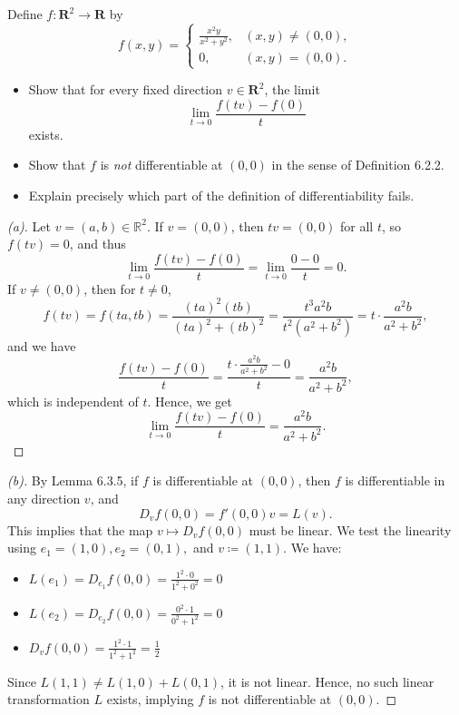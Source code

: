 \begin{problem}
    Define $f : \mathbf{R}^2 \to \mathbf{R}$ by
$$
f(x,y)=
\begin{cases}
\displaystyle
\frac{x^2 y}{x^2+y^2}, & (x,y)\neq(0,0),\\[1em]
0, & (x,y)=(0,0).
\end{cases}
$$

\begin{itemize}
\item[(a)] Show that for every fixed direction $v\in\mathbf{R}^2$, 
the limit
$$
\lim_{t\to 0} \frac{f(tv)-f(0)}{t}
$$
exists.

\item[(b)] Show that $f$ is \emph{not} differentiable at $(0,0)$
in the sense of Definition 6.2.2.

\item[(c)] Explain precisely which part of the definition of differentiability fails.
\end{itemize}
\end{problem}

\begin{proof}[(a)]
    Let $v=(a,b)\in\mathbb{R}^{2}$. If $v=(0,0)$, then $tv=(0,0)$ for all $t$, so $f(tv)=0$, and thus 
    \[
    \lim_{t\rightarrow0}\frac{f(tv)-f(0)}{t}=\lim_{t\to 0} \frac{0-0}{t} = 0.
    \]
    If $v \ne (0,0)$, then for $t \ne 0$,
    \[
    f(tv) = f(ta,tb)=\frac{(ta)^2(tb)}{(ta)^2 + (tb)^2} = \frac{t^3 a^2 b}{t^2(a^2 + b^2)} = t \cdot \frac{a^2 b}{a^2 + b^2},
    \]
    and we have
    \[
    \frac{f(tv)-f(0)}{t} = \frac{t \cdot \frac{a^2 b}{a^2 + b^2} - 0}{t} = \frac{a^2 b}{a^2 + b^2},
    \]
    which is independent of $t$. Hence, we get
    \[
    \lim_{t\to 0}\frac{f(tv)-f(0)}{t} = \frac{a^{2}b}{a^{2}+b^{2}}.
    \]
\end{proof}

\begin{proof}[(b)]
    By Lemma 6.3.5, if $f$ is differentiable at $(0,0)$, then $f$ is differentiable in any direction $v$, and 
    \[
    D_vf(0,0)=f'(0,0)v=L(v).
    \]
    This implies that the map $v \mapsto D_v f(0,0)$ must be linear. We test the linearity using $e_1=(1,0), e_2=(0,1),$ and $v\coloneqq(1,1)$. We have:
    \begin{itemize}
        \item $L(e_1) = D_{e_1}f(0,0) = \frac{1^2 \cdot 0}{1^2 + 0^2} = 0$
        \item $L(e_2) = D_{e_2}f(0,0) = \frac{0^2 \cdot 1}{0^2 + 1^2} = 0$
        \item $D_{v}f(0,0) = \frac{1^2 \cdot 1}{1^2 + 1^2} = \frac{1}{2}$
    \end{itemize}
    Since $L(1,1) \ne L(1,0) + L(0,1)$, it is not linear. Hence, no such linear transformation $L$ exists, implying $f$ is not differentiable at $(0,0)$.
\end{proof}

